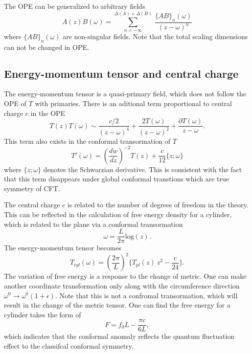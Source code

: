 \documentclass[submission, PhysLectNotes]{SciPost}
\begin{document}
The OPE can be generalized to arbitrary fields
\begin{equation}
A(z) B(\omega) = \sum_{n=-\infty}^{\Delta(A) + \Delta(B)}\  \frac{\{AB\}_n(\omega)}{\left(z-\omega\right)^n}
\end{equation}
where $\{AB\}_n(\omega)$ are non-singular fields. Note that the total scaling dimensions can not be changed in OPE.



\subsection{Energy-momentum tensor and central charge}
The energy-momentum tensor is a quasi-primary field, which does not follow the OPE of $T$ with primaries. There is an aditional term proportional to central charge $c$ in the OPE
\begin{equation}
T(z)T(\omega) \sim \frac{c/2}{\left(z-\omega\right)^4} + \frac{2 T(\omega)}{\left(z-\omega\right)^2} + \frac{\partial T(\omega)}{z-\omega}.
\end{equation}
This term also exists in the conformal transormation of $T$
\begin{equation}
T'(\omega) = \left(\frac{dw}{dz}\right)^{-2} T(z) + \frac{c}{12}\{z;\omega\}
\end{equation}
where $\{z;\omega\}$ denotes the Schwarzian derivative. This is consistent with the fact that this term disappears under global conformal transtions which are true symmetry of CFT. 

The central charge $c$ is related to the number of degrees of freedom in the theory. This can be reflected in the calculation of free energy density for a cylinder, which is related to the plane via a conformal transormation
\begin{equation}
\omega = \frac{L}{2\pi} \mathrm{log} (z).
\end{equation}
The energy-momentum tensor becomes 
\begin{equation}
T_{cyl}(\omega) = \left(\frac{2\pi}{L}\right)^2 \{T_{pl}(z)\ z^2 - \frac{c}{24}\}.
\end{equation}
The variation of free energy is a response to the change of metric. One can make another coordinate transformation only along with the circumference direction $\omega^0 \rightarrow \omega^0(1+\epsilon)$. Note that this is not a confromal transormation, which will result in the change of the metric tensor. One can find the free energy for a cylinder takes the form of
\begin{equation}
F = f_0 L - \frac{\pi c}{6L},
\end{equation}
which indicates that the conformal anomaly reflects the quantum fluctuation effect to the classifcal conformal symmetry.   
\end{document}
